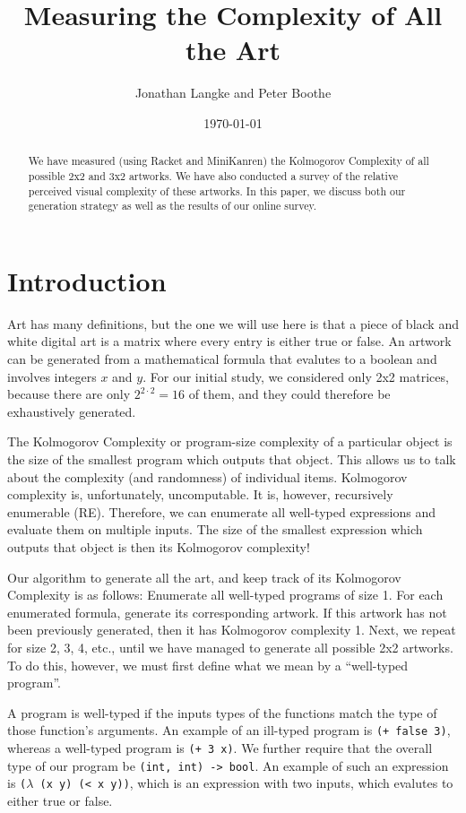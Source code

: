 \documentclass[11pt]{article}
\title{Measuring the Complexity of All the Art}
\author{Jonathan Langke and Peter Boothe}
\date{\today}
\begin{document}
\maketitle

\begin{abstract}
We have measured (using Racket and MiniKanren) the Kolmogorov Complexity of all
possible 2x2 and 3x2 artworks.  We have also conducted a survey of the relative
perceived visual complexity of these artworks.  In this paper, we discuss both
our generation strategy as well as the results of our online survey.
\end{abstract}

\section{Introduction}

Art has many definitions, but the one we will use here is that a piece of black
and white digital art is a matrix where every entry is either true or false.
An artwork can be generated from a mathematical formula that evalutes to a
boolean and involves integers $x$ and $y$.  For our initial study, we
considered only 2x2 matrices, because there are only $2^{2\cdot2} = 16$ of
them, and they could therefore be exhaustively generated.

The Kolmogorov Complexity or program-size complexity of a particular object is
the size of the smallest program which outputs that object.  This allows us to
talk about the complexity (and randomness) of individual items.  Kolmogorov
complexity is, unfortunately, uncomputable.  It is, however, recursively
enumerable (RE).  Therefore, we can enumerate all well-typed expressions and
evaluate them on multiple inputs.  The size of the smallest expression which
outputs that object is then its Kolmogorov complexity!

Our algorithm to generate all the art, and keep track of its Kolmogorov
Complexity is as follows: Enumerate all well-typed programs of size 1.  For
each enumerated formula, generate its corresponding artwork.  If this artwork
has not been previously generated, then it has Kolmogorov complexity 1.  Next,
we repeat for size 2, 3, 4, etc., until we have managed to generate all
possible 2x2 artworks.  To do this, however, we must first define what we mean
by a ``well-typed program''.

A program is well-typed if the inputs types of the functions match the type of
those function's arguments.  An example of an ill-typed program is {\tt (+
false 3)}, whereas a well-typed program is {\tt (+ 3 x)}.  We further require
that the overall type of our program be {\tt (int, int) -> bool}.  An example
of such an expression is {\tt ($\lambda$ (x y) (< x y))}, which is an
expression with two inputs, which evalutes to either true or false.
\end{document}
